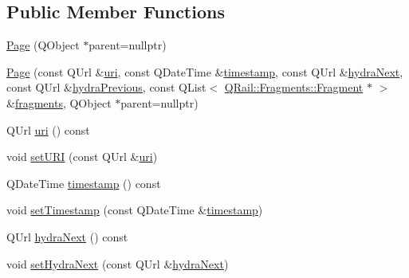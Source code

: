 \subsection*{Public Member Functions}
\begin{DoxyCompactItemize}
\item 
\mbox{\hyperlink{classQRail_1_1Fragments_1_1Page_ad674b8b6a51f72b955128f03f92f7927}{Page}} (Q\+Object $\ast$parent=nullptr)
\item 
\mbox{\hyperlink{classQRail_1_1Fragments_1_1Page_a44651659fab3540378a14906ef6c5ca4}{Page}} (const Q\+Url \&\mbox{\hyperlink{classQRail_1_1Fragments_1_1Page_a55b83d498119763fb6218ccb0959967e}{uri}}, const Q\+Date\+Time \&\mbox{\hyperlink{classQRail_1_1Fragments_1_1Page_aea27ab5b1a9aafe43afbc98ccb38f429}{timestamp}}, const Q\+Url \&\mbox{\hyperlink{classQRail_1_1Fragments_1_1Page_abac5d1c1b6bc72623725ac9585ed1a86}{hydra\+Next}}, const Q\+Url \&\mbox{\hyperlink{classQRail_1_1Fragments_1_1Page_abd9b826a513ec4f7ca3803cd52678596}{hydra\+Previous}}, const Q\+List$<$ \mbox{\hyperlink{classQRail_1_1Fragments_1_1Fragment}{Q\+Rail\+::\+Fragments\+::\+Fragment}} $\ast$ $>$ \&\mbox{\hyperlink{classQRail_1_1Fragments_1_1Page_a24f93fc23c2f2795fc3d662aed48c7d9}{fragments}}, Q\+Object $\ast$parent=nullptr)
\item 
Q\+Url \mbox{\hyperlink{classQRail_1_1Fragments_1_1Page_a55b83d498119763fb6218ccb0959967e}{uri}} () const
\item 
void \mbox{\hyperlink{classQRail_1_1Fragments_1_1Page_ad29711549fc506722906445fd2e83bcf}{set\+U\+RI}} (const Q\+Url \&\mbox{\hyperlink{classQRail_1_1Fragments_1_1Page_a55b83d498119763fb6218ccb0959967e}{uri}})
\item 
Q\+Date\+Time \mbox{\hyperlink{classQRail_1_1Fragments_1_1Page_aea27ab5b1a9aafe43afbc98ccb38f429}{timestamp}} () const
\item 
void \mbox{\hyperlink{classQRail_1_1Fragments_1_1Page_a56f386c0514069d5a7013d1cab715a65}{set\+Timestamp}} (const Q\+Date\+Time \&\mbox{\hyperlink{classQRail_1_1Fragments_1_1Page_aea27ab5b1a9aafe43afbc98ccb38f429}{timestamp}})
\item 
Q\+Url \mbox{\hyperlink{classQRail_1_1Fragments_1_1Page_abac5d1c1b6bc72623725ac9585ed1a86}{hydra\+Next}} () const
\item 
void \mbox{\hyperlink{classQRail_1_1Fragments_1_1Page_a91fb6b3858cf55f4f3839837f55784a0}{set\+Hydra\+Next}} (const Q\+Url \&\mbox{\hyperlink{classQRail_1_1Fragments_1_1Page_abac5d1c1b6bc72623725ac9585ed1a86}{hydra\+Next}})
\item 

\end{DoxyCompactItemize}
